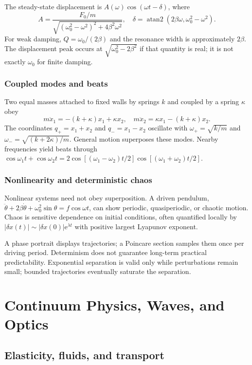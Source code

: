 \documentclass[11pt,oneside]{book}
\newcommand{\ee}{\mathrm{e}}
\theoremstyle{reviewstyle}
\begin{document}
The steady-state displacement is $A(\omega)\cos(\omega t-\delta)$, where
\begin{equation}
A=\frac{F_0/m}{\sqrt{(\omega_0^2-\omega^2)^2+4\beta^2\omega^2}},\quad
\delta=\operatorname{atan2}(2\beta\omega,\omega_0^2-\omega^2).
\end{equation}
For weak damping, $Q=\omega_0/(2\beta)$ and the resonance width is approximately $2\beta$. The displacement peak occurs at $\sqrt{\omega_0^2-2\beta^2}$ if that quantity is real; it is not exactly $\omega_0$ for finite damping.
\section{Coupled modes and beats}
Two equal masses attached to fixed walls by springs $k$ and coupled by a spring $\kappa$ obey
\begin{equation}
m\ddot x_1=-(k+\kappa)x_1+\kappa x_2,\quad
m\ddot x_2=\kappa x_1-(k+\kappa)x_2.
\end{equation}
The coordinates $q_+=x_1+x_2$ and $q_-=x_1-x_2$ oscillate with
$\omega_+=\sqrt{k/m}$ and $\omega_-=\sqrt{(k+2\kappa)/m}$. General motion superposes these modes. Nearby frequencies yield beats through
$\cos\omega_1t+\cos\omega_2t=2\cos[(\omega_1-\omega_2)t/2]\cos[(\omega_1+\omega_2)t/2]$.
\section{Nonlinearity and deterministic chaos}
Nonlinear systems need not obey superposition. A driven pendulum,
$\ddot\theta+2\beta\dot\theta+\omega_0^2\sin\theta=f\cos\omega t$,
can show periodic, quasiperiodic, or chaotic motion. Chaos is sensitive dependence on initial conditions, often quantified locally by
$|\delta x(t)|\sim|\delta x(0)|\ee^{\lambda t}$ with positive largest Lyapunov exponent.

A phase portrait displays trajectories; a Poincare section samples them once per driving period. Determinism does not guarantee long-term practical predictability. Exponential separation is valid only while perturbations remain small; bounded trajectories eventually saturate the separation.

\part{Continuum Physics, Waves, and Optics}
\chapter{Elasticity, fluids, and transport}
\end{document}
